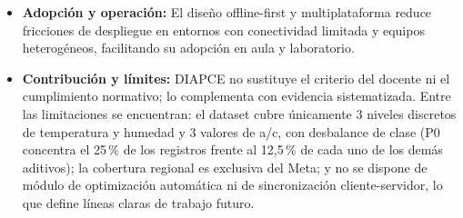 \begin{itemize}
  \item \textbf{Adopción y operación:} El diseño offline-first y multiplataforma reduce fricciones de despliegue en entornos con conectividad limitada y equipos heterogéneos, facilitando su adopción en aula y laboratorio.

  \item \textbf{Contribución y límites:} DIAPCE no sustituye el criterio del docente ni el cumplimiento normativo; lo complementa con evidencia sistematizada. Entre las limitaciones se encuentran: el dataset cubre únicamente 3 niveles discretos de temperatura y humedad y 3 valores de a/c, con desbalance de clase (P0 concentra el 25\,\% de los registros frente al 12{,}5\,\% de cada uno de los demás aditivos); la cobertura regional es exclusiva del Meta; y no se dispone de módulo de optimización automática ni de sincronización cliente-servidor, lo que define líneas claras de trabajo futuro.
\end{itemize}
